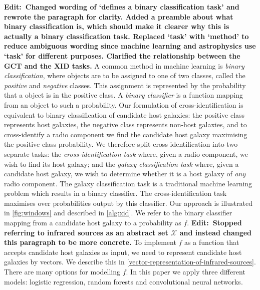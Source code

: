 \documentclass[fleqn,usenatbib,usedcolumn]{mnras}
\newcommand{\edit}[1]{{\bf Edit:~{#1}}}
\begin{document}
    \edit{Changed wording of `defines a binary classification task' and rewrote the paragraph for clarity. Added a preamble about what binary classification is, which should make it clearer why this is actually a binary classification task. Replaced `task' with `method' to reduce ambiguous wording since machine learning and astrophysics use `task' for different purposes. Clarified the relationship between the GCT and the XID tasks.} A common method in machine learning is \emph{binary classification}, where objects are to be assigned to one of two classes, called the \emph{positive} and \emph{negative} classes. This assignment is represented by the probability that a object is in the positive class. A \emph{binary classifier} is a function mapping from an object to such a probability. Our formulation of cross-identification is equivalent to binary classification of candidate host galaxies: the positive class represents host galaxies, the negative class represents non-host galaxies, and to cross-identify a radio component we find the candidate host galaxy maximising the positive class probability. We therefore split cross-identification into two separate tasks: the \emph{cross-identification task} where, given a radio component, we wish to find its host galaxy; and the \emph{galaxy classification task} where, given a candidate host galaxy, we wish to determine whether it is a host galaxy of \emph{any} radio component. The galaxy classification task is a traditional machine learning problem which results in a binary classifier. The cross-identification task maximises over probabilities output by this classifier. Our approach is illustrated in \autoref{fig:windows} and described in \autoref{alg:xid}. We refer to the binary classifier mapping from a candidate host galaxy to a probability as $f$. \edit{Stopped referring to infrared sources as an abstract set $\mathcal X$ and instead changed this paragraph to be more concrete.} To implement $f$ as a function that accepts candidate host galaxies as input, we need to represent candidate host galaxies by vectors. We describe this in \autoref{vector-representation-of-infrared-sources}. There are many options for modelling $f$. In this paper we apply three different models: logistic regression, random forests and convolutional neural networks.
\end{document}
